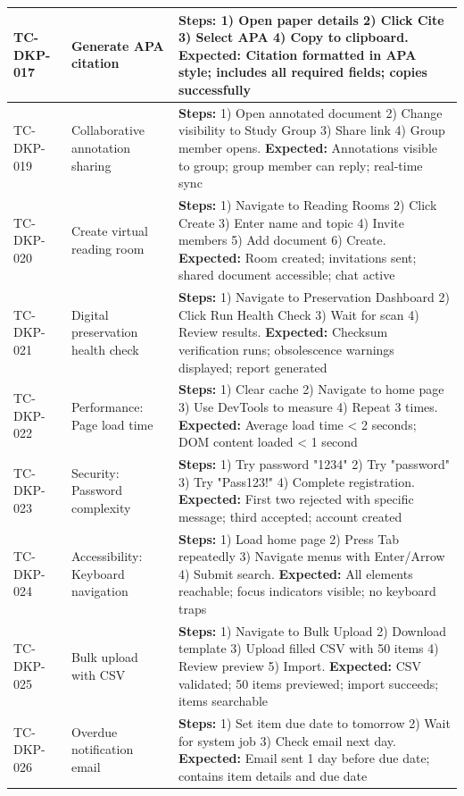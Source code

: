\documentclass[12pt,a4paper]{report}
\begin{document}
\begin{longtable}{|p{2cm}|p{3cm}|p{8.5cm}|}
TC-DKP-017 & Generate APA citation & \textbf{Steps:} 1) Open paper details 2) Click Cite 3) Select APA 4) Copy to clipboard. \textbf{Expected:} Citation formatted in APA style; includes all required fields; copies successfully \\ \hline
TC-DKP-019 & Collaborative annotation sharing & \textbf{Steps:} 1) Open annotated document 2) Change visibility to Study Group 3) Share link 4) Group member opens. \textbf{Expected:} Annotations visible to group; group member can reply; real-time sync \\ \hline
TC-DKP-020 & Create virtual reading room & \textbf{Steps:} 1) Navigate to Reading Rooms 2) Click Create 3) Enter name and topic 4) Invite members 5) Add document 6) Create. \textbf{Expected:} Room created; invitations sent; shared document accessible; chat active \\ \hline
TC-DKP-021 & Digital preservation health check & \textbf{Steps:} 1) Navigate to Preservation Dashboard 2) Click Run Health Check 3) Wait for scan 4) Review results. \textbf{Expected:} Checksum verification runs; obsolescence warnings displayed; report generated \\ \hline
TC-DKP-022 & Performance: Page load time & \textbf{Steps:} 1) Clear cache 2) Navigate to home page 3) Use DevTools to measure 4) Repeat 3 times. \textbf{Expected:} Average load time < 2 seconds; DOM content loaded < 1 second \\ \hline
TC-DKP-023 & Security: Password complexity & \textbf{Steps:} 1) Try password "1234" 2) Try "password" 3) Try "Pass123!" 4) Complete registration. \textbf{Expected:} First two rejected with specific message; third accepted; account created \\ \hline
TC-DKP-024 & Accessibility: Keyboard navigation & \textbf{Steps:} 1) Load home page 2) Press Tab repeatedly 3) Navigate menus with Enter/Arrow 4) Submit search. \textbf{Expected:} All elements reachable; focus indicators visible; no keyboard traps \\ \hline
TC-DKP-025 & Bulk upload with CSV & \textbf{Steps:} 1) Navigate to Bulk Upload 2) Download template 3) Upload filled CSV with 50 items 4) Review preview 5) Import. \textbf{Expected:} CSV validated; 50 items previewed; import succeeds; items searchable \\ \hline
TC-DKP-026 & Overdue notification email & \textbf{Steps:} 1) Set item due date to tomorrow 2) Wait for system job 3) Check email next day. \textbf{Expected:} Email sent 1 day before due date; contains item details and due date \\ \hline

\end{longtable}
\end{document}
